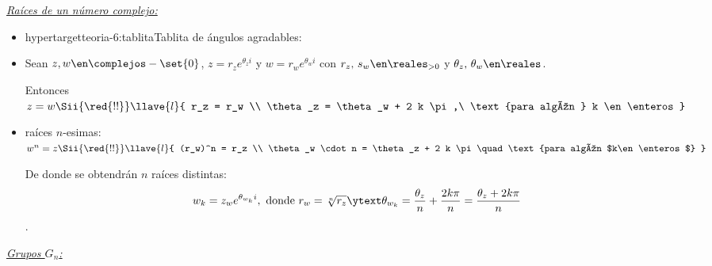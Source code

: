 \textit{\underline{Raíces de un número complejo: }}


\begin{itemize}[label= \tiny {}]
                
        \item hypertarget{teoria-6:tablita}{Tablita de ángulos agradables}:
  \item Sean $z, w \en \complejos -\set{0}$, $z = r_z e^{\theta_z i}$ y $w = r_w e^{\theta_w i }$ con $r_z,\, s_w \en \reales_{>0}$
        y $\theta_z,\, \theta_w \en \reales$.\par
        Entonces $z = w
          \Sii{\red{!!}}
          \llave{l}{
          r_z = r_w \\
          \theta_z = \theta_w + 2 k \pi,\ \text{para algún } k \en \enteros
          }$
  \item raíces $n$-esimas: $w^n = z
          \Sii{\red{!!}}
          \llave{l}{
          (r_w)^n = r_z \\
          \theta_w \cdot n = \theta_z + 2 k \pi \quad \text{para algún $k\en \enteros$}
          }$\par
        De donde se obtendrán $n$ raíces distintas:
        $$
          w_k = z_w e^{\theta_{w_k} i}, \text{ donde } r_w = \sqrt[n]{r_z} \ytext
          \theta_{w_k} = \frac{\theta_z}{n} + \frac{2k\pi}{n} = \frac{\theta_z + 2k\pi}{n}
        $$
        .
\end{itemize}

\underline{\textit{Grupos $G_n$:}}

